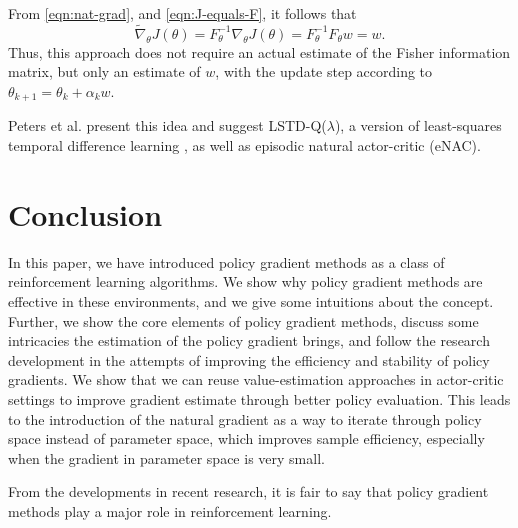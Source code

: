 \documentclass[final]{IEEEtran}
\begin{document}
From \eqref{eqn:nat-grad}, and \eqref{eqn:J-equals-F}, it follows that
\begin{equation}
  \widetilde{\nabla}_\theta J(\theta) = F^{-1}_\theta \nabla_\theta J(\theta) = F_\theta^{-1} F_\theta w = w.
\end{equation}
Thus, this approach does not require an actual estimate of the Fisher information matrix, but only an estimate of $w$, with the update step according to $\theta_{k+1} = \theta_k + \alpha_k w$.

Peters et al. \cite{4863} present this idea and suggest LSTD-Q($\lambda$), a version of least-squares temporal difference learning  \cite{Boyan:1999:LTD:645528.657618}, as well as episodic natural actor-critic (eNAC).

\section{Conclusion}
\label{sec:outro}

In this paper, we have introduced policy gradient methods as a class of reinforcement learning algorithms. 
We show why policy gradient methods are effective in these environments, and we give some intuitions about the concept. 
Further, we show the core elements of policy gradient methods, discuss some intricacies the estimation of the policy gradient brings, and follow the research development in the attempts of improving the efficiency and stability of policy gradients.
We show that we can reuse value-estimation approaches in actor-critic settings to improve gradient estimate through better policy evaluation.
This leads to the introduction of the natural gradient as a way to iterate through policy space instead of parameter space, which improves sample efficiency, especially when the gradient in parameter space is very small.

From the developments in recent research, it is fair to say that policy gradient methods play a major role in reinforcement learning. 



\end{document}
